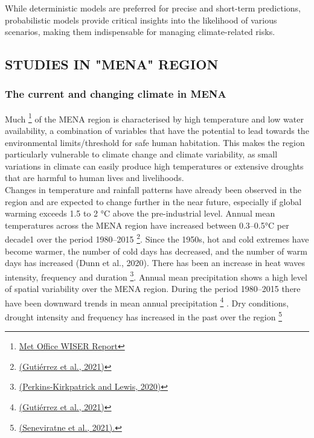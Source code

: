 \noindent While deterministic models are preferred for precise and short-term predictions, probabilistic models provide critical insights into the likelihood of various scenarios, making them indispensable for managing climate-related risks.
\subsection{ STUDIES IN "MENA" REGION }
\subsubsection{The current and changing climate in MENA}
Much \footnote{\href{https://www.metoffice.gov.uk/binaries/content/assets/metofficegovuk/pdf/business/international/wiser/wiser-mena-scoping-study-external-v2.pdf}{Met Office WISER Report}} of the MENA region is characterised by high temperature and low water availability, a
combination of variables that have the potential to lead towards the environmental
limits/threshold for safe human habitation. This makes the region
particularly vulnerable to climate change and climate variability, as small variations in climate
can easily produce high temperatures or extensive droughts that are harmful to human lives
and livelihoods.\\

Changes in temperature and rainfall patterns have already been observed in the region and
are expected to change further in the near future, especially if global warming exceeds 1.5 to
2 °C above the pre-industrial level. Annual mean temperatures across the MENA region
have increased between 0.3–0.5°C per decade1 over the period 1980–2015 \footnote{\href{https://pubs.giss.nasa.gov/abs/gu00200u.html}{(Gutiérrez et al.,
2021)}}. Since the 1950s, hot and cold extremes have become warmer, the number of cold
days has decreased, and the number of warm days has increased (Dunn et al., 2020). There
has been an increase in heat waves intensity, frequency and duration    \footnote{\href{https://www.nature.com/articles/s41467-020-16970-7}{(Perkins-Kirkpatrick
and Lewis, 2020)}}. Annual mean precipitation shows a high level of spatial variability over the
MENA region. During the period 1980–2015 there have been downward trends in mean
annual precipitation \footnote{\href{https://pubs.giss.nasa.gov/abs/gu00200u.html}{(Gutiérrez et al., 2021)}} . Dry conditions, drought intensity and frequency
has increased in the past over the region \footnote{\href{https://www.nature.com/articles/s43247-021-00094-x}{(Seneviratne et al., 2021).}} 




